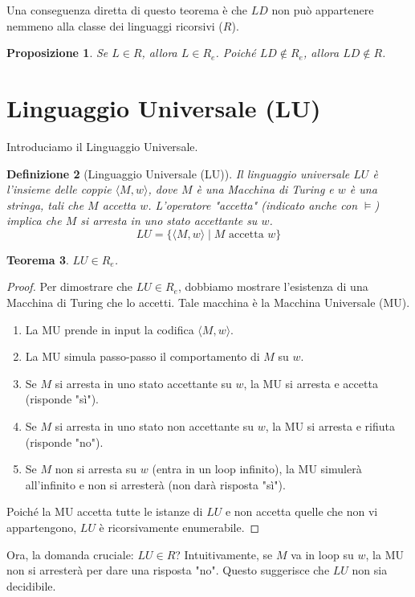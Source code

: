 \documentclass[a4paper, 11pt]{book} %
\newtheorem{theorem}{Teorema}[section]
\newtheorem{definition}[theorem]{Definizione}
\newtheorem{proposition}[theorem]{Proposizione}
\theoremstyle{definition}
\begin{document}
Una conseguenza diretta di questo teorema è che $LD$ non può appartenere nemmeno alla classe dei linguaggi ricorsivi ($R$).
\begin{proposition}
Se $L \in R$, allora $L \in R_e$.
Poiché $LD \notin R_e$, allora $LD \notin R$.
\end{proposition}

\section{Linguaggio Universale (LU)}

Introduciamo il Linguaggio Universale.
\begin{definition}[Linguaggio Universale (LU)]
Il linguaggio universale $LU$ è l'insieme delle coppie $\langle M, w \rangle$, dove $M$ è una Macchina di Turing e $w$ è una stringa, tali che $M$ accetta $w$. L'operatore "accetta" (indicato anche con $\models$) implica che $M$ si arresta in uno stato accettante su $w$.
\[ LU = \{ \langle M, w \rangle \mid M \text{ accetta } w \} \]
\end{definition}

\begin{theorem}
$LU \in R_e$.
\end{theorem}
\begin{proof}
Per dimostrare che $LU \in R_e$, dobbiamo mostrare l'esistenza di una Macchina di Turing che lo accetti. Tale macchina è la Macchina Universale (MU).
\begin{enumerate}
    \item La MU prende in input la codifica $\langle M, w \rangle$.
    \item La MU simula passo-passo il comportamento di $M$ su $w$.
    \item Se $M$ si arresta in uno stato accettante su $w$, la MU si arresta e accetta (risponde "sì").
    \item Se $M$ si arresta in uno stato non accettante su $w$, la MU si arresta e rifiuta (risponde "no").
    \item Se $M$ non si arresta su $w$ (entra in un loop infinito), la MU simulerà all'infinito e non si arresterà (non darà risposta "sì").
\end{enumerate}
Poiché la MU accetta tutte le istanze di $LU$ e non accetta quelle che non vi appartengono, $LU$ è ricorsivamente enumerabile.
\end{proof}

Ora, la domanda cruciale: $LU \in R$? Intuitivamente, se $M$ va in loop su $w$, la MU non si arresterà per dare una risposta "no". Questo suggerisce che $LU$ non sia decidibile.
\end{document}
